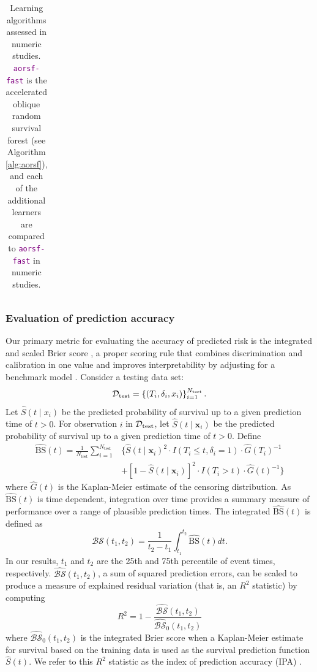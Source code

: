 \documentclass{article}\usepackage[]{graphicx}\usepackage[]{xcolor}
\newcommand{\dataset}{{\cal D}}
\newcommand{\ie}{that is}
\newcommand{\bstat}{\widehat{\text{BS}}(t)}
\newcommand{\bsbar}{\mathcal{\widehat{BS}}(t_1, t_2)}
\newcommand{\bskap}{\mathcal{\widehat{BS}}_0(t_1, t_2)}
\newcommand{\ntest}{N_{\text{test}}}
\begin{document}
\begin{landscape}
\begin{table}[h!]
\begin{tabular}{p{2cm} | p{3cm} p{4cm} p{12cm}}
\end{tabular}
\caption{Learning algorithms assessed in numeric studies. \textcolor{purple}{\texttt{aorsf-fast}} is the accelerated oblique random survival forest (see Algorithm \ref{alg:aorsf}), and each of the additional learners are compared to \textcolor{purple}{\texttt{aorsf-fast}} in numeric studies.}
\label{tab:learners}
\end{table}

\end{landscape}
\restoregeometry



\subsubsection{Evaluation of prediction accuracy} \label{sec:prediction_accuracy}

Our primary metric for evaluating the accuracy of predicted risk is the integrated and scaled Brier score \citep{graf1999assessment}, a proper scoring rule that combines discrimination and calibration in one value and improves interpretability by adjusting for a benchmark model \citep{kattan2018index}. Consider a testing data set:
$$\dataset_{\text{test}} = \left\{ (T_i, \delta_i, x_{i}) \right\}_{i=1}^{N_{\text{test}}}.$$
Let $\widehat{S}(t \mid x_i)$ be the predicted probability of survival up to a given prediction time of $t > 0$.
 For observation $i$ in $\dataset_{\text{test}}$, let $\widehat{S}(t \mid \bm{x}_i)$ be the predicted probability of survival up to a given prediction time of $t > 0$. Define \begin{align*}
\bstat = \frac{1}{\ntest} \sum_{i=1}^{\ntest} &\{ \widehat{S}(t \mid \bm{x}_i)^2 \cdot I(T_i \leq t, \delta_i = 1) \cdot \widehat{G}(T_i)^{-1} \\ &+ [1-\widehat{S}(t \mid \bm{x}_i)]^2 \cdot I(T_i > t) \cdot \widehat{G}(t)^{-1}\}
\end{align*} where $\widehat{G}(t)$ is the Kaplan-Meier estimate of the censoring distribution. As $\bstat$ is time dependent, integration over time provides a summary measure of performance over a range of plausible prediction times. The integrated $\bstat$ is defined as \begin{equation}
\bsbar = \frac{1}{t_2 - t_1}\int_{t_1}^{t_2} \widehat{\text{BS}}(t) dt.
\end{equation} In our results, $t_1$ and $t_2$ are the 25th and 75th percentile of event times, respectively. $\bsbar$, a sum of squared prediction errors, can be scaled to produce a measure of explained residual variation (\ie, an $R^2$ statistic) by computing \begin{equation}
R^2 = 1 - \frac{\bsbar}{\bskap}
\end{equation} where $\bskap$ is the integrated Brier score when a Kaplan-Meier estimate for survival based on the training data is used as the survival prediction function $\widehat{S}(t)$. We refer to this $R^2$ statistic as the index of prediction accuracy (IPA) \citep{kattan2018index}.
\end{document}
